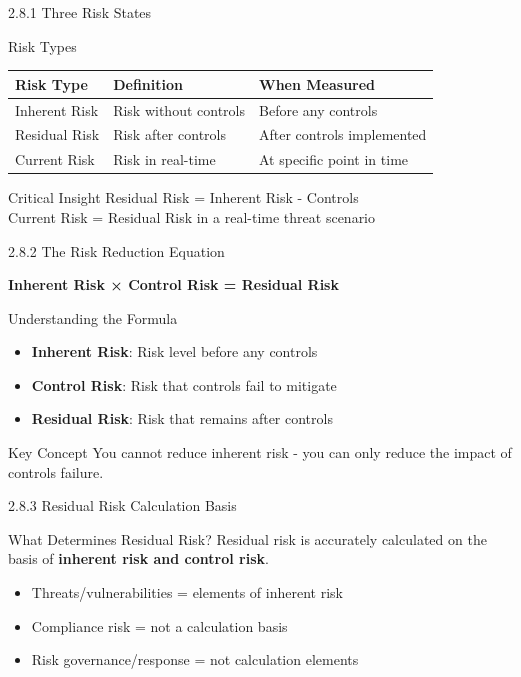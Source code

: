 \documentclass{beamer}
\begin{document}
	\begin{frame}{2.8.1 Three Risk States}
		\begin{block}{Risk Types}
			\begin{tabular}{|p{2.5cm}|p{4cm}|p{4.5cm}|}
				\hline
				\textbf{Risk Type} & \textbf{Definition} & \textbf{When Measured} \\
				\hline
				Inherent Risk & Risk without controls & Before any controls \\
				\hline
				Residual Risk & Risk after controls & After controls implemented \\
				\hline
				Current Risk & Risk in real-time & At specific point in time \\
				\hline
			\end{tabular}
		\end{block}
		\begin{alertblock}{Critical Insight}
			Residual Risk = Inherent Risk - Controls \\
			Current Risk = Residual Risk in a real-time threat scenario
		\end{alertblock}
	\end{frame}
	
	\begin{frame}{2.8.2 The Risk Reduction Equation}
		\begin{center}
			\Large{\textbf{Inherent Risk × Control Risk = Residual Risk}}
		\end{center}
		\begin{block}{Understanding the Formula}
			\begin{itemize}
				\item \textbf{Inherent Risk}: Risk level before any controls
				\item \textbf{Control Risk}: Risk that controls fail to mitigate
				\item \textbf{Residual Risk}: Risk that remains after controls
			\end{itemize}
		\end{block}
		\begin{exampleblock}{Key Concept}
			You cannot reduce inherent risk - you can only reduce the impact of controls failure.
		\end{exampleblock}
	\end{frame}
	
	\begin{frame}{2.8.3 Residual Risk Calculation Basis}
		\begin{block}{What Determines Residual Risk?}
			Residual risk is accurately calculated on the basis of \textbf{inherent risk and control risk}.
		\end{block}
		\begin{itemize}
			\item Threats/vulnerabilities = elements of inherent risk
			\item Compliance risk = not a calculation basis
			\item Risk governance/response = not calculation elements
		\end{itemize}
	\end{frame}
	
\end{document}
